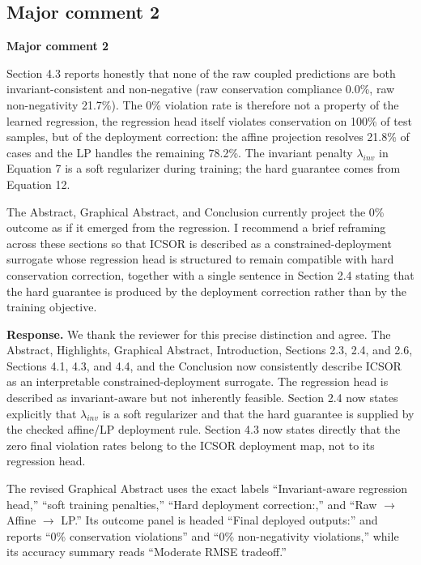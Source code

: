 \documentclass[11pt,a4paper]{article}
\begin{document}
\subsection*{Major comment 2}

\begin{reviewercomment}
\textbf{Major comment 2}

Section 4.3 reports honestly that none of the raw coupled predictions are both invariant-consistent and non-negative (raw conservation compliance 0.0\%, raw non-negativity 21.7\%). The 0\% violation rate is therefore not a property of the learned regression, the regression head itself violates conservation on 100\% of test samples, but of the deployment correction: the affine projection resolves 21.8\% of cases and the LP handles the remaining 78.2\%. The invariant penalty $\lambda_{inv}$ in Equation 7 is a soft regularizer during training; the hard guarantee comes from Equation 12.

The Abstract, Graphical Abstract, and Conclusion currently project the 0\% outcome as if it emerged from the regression. I recommend a brief reframing across these sections so that ICSOR is described as a constrained-deployment surrogate whose regression head is structured to remain compatible with hard conservation correction, together with a single sentence in Section 2.4 stating that the hard guarantee is produced by the deployment correction rather than by the training objective.
\end{reviewercomment}

\noindent\textbf{Response.} We thank the reviewer for this precise distinction and agree. The Abstract, Highlights, Graphical Abstract, Introduction, Sections 2.3, 2.4, and 2.6, Sections 4.1, 4.3, and 4.4, and the Conclusion now consistently describe ICSOR as an interpretable constrained-deployment surrogate. The regression head is described as invariant-aware but not inherently feasible. Section 2.4 now states explicitly that $\lambda_{inv}$ is a soft regularizer and that the hard guarantee is supplied by the checked affine/LP deployment rule. Section 4.3 now states directly that the zero final violation rates belong to the ICSOR deployment map, not to its regression head.

The revised Graphical Abstract uses the exact labels ``Invariant-aware regression head,'' ``soft training penalties,'' ``Hard deployment correction:,'' and ``Raw $\rightarrow$ Affine $\rightarrow$ LP.'' Its outcome panel is headed ``Final deployed outputs:'' and reports ``0\% conservation violations'' and ``0\% non-negativity violations,'' while its accuracy summary reads ``Moderate RMSE tradeoff.''
\end{document}
